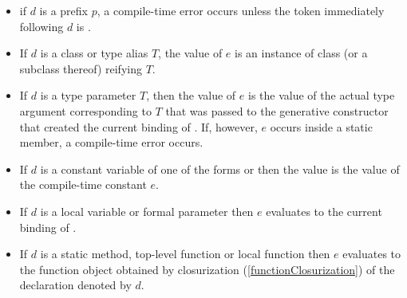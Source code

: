 \documentclass{article}
\begin{document}
\begin{itemize}
\item if $d$ is a prefix $p$, a compile-time error occurs unless the token immediately following $d$ is .
\item If $d$ is a class or type alias $T$, the value of $e$ is an instance of class  (or a subclass thereof) reifying $T$.
\item If $d$ is a type parameter $T$, then the value of $e$ is the value of the actual type argument corresponding to $T$ that was passed to the generative constructor that created the current binding of \THIS{}.
If, however, $e$ occurs inside a static member, a compile-time error occurs.

\item If $d$ is a constant variable of one of the forms  or  then the value \id{} is the value of the compile-time constant $e$.
\item If $d$ is a local variable or formal parameter then $e$ evaluates to the current binding of \id.
\item If $d$ is a static method, top-level function or local function then $e$ evaluates to the function object obtained by closurization (\ref{functionClosurization}) of the declaration denoted by $d$.

\end{itemize}
\end{document}
